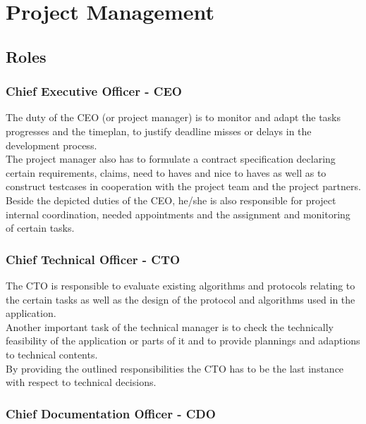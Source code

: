
\section{Project Management}

\subsection{Roles}

\subsubsection{Chief Executive Officer - CEO}
\label{sec:pm:roles:ceo}
The duty of the CEO (or project manager) is to monitor and adapt the tasks progresses and the timeplan, 
to justify deadline misses or delays in the development process.\\

The project manager also has to formulate a contract specification declaring certain requirements, 
claims, need to haves and nice to haves as well as to construct testcases in cooperation with the project 
team and the project partners.\\

Beside the depicted duties of the CEO, he/she is also responsible for project internal coordination, 
needed appointments and the assignment and monitoring of certain tasks.\\

\subsubsection{Chief Technical Officer - CTO}
\label{sec:pm:roles:cto}
The CTO is responsible to evaluate existing algorithms and protocols relating to the certain 
tasks as well as the design of the protocol and algorithms used in the application.\\

Another important task of the technical manager is to check the technically feasibility 
of the application or parts of it and to provide plannings and adaptions to technical contents.\\

By providing the outlined responsibilities the CTO has to be the last instance with respect to technical decisions.\\


\subsubsection{Chief Documentation Officer - CDO}
\label{sec:pm:roles:cdo}

